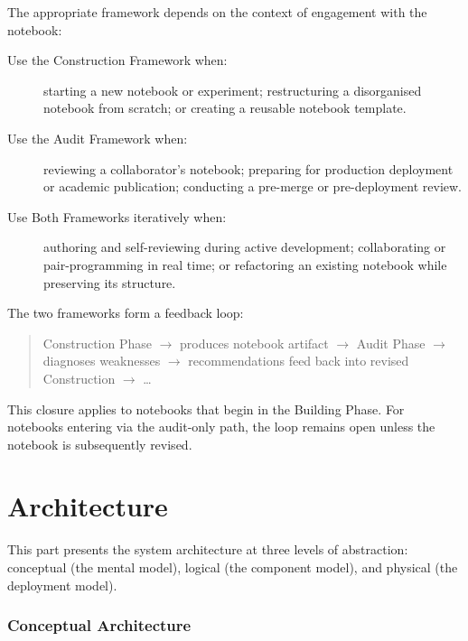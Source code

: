 \documentclass[11pt, a4paper]{article}
\begin{document}
The appropriate framework depends on the context of engagement with the
notebook:

\begin{description}
  \item[Use the Construction Framework when:] starting a new notebook or
    experiment; restructuring a disorganised notebook from scratch; or creating
    a reusable notebook template.

  \item[Use the Audit Framework when:] reviewing a collaborator's notebook;
    preparing for production deployment or academic publication; conducting a
    pre-merge or pre-deployment review.

  \item[Use Both Frameworks iteratively when:] authoring and self-reviewing
    during active development; collaborating or pair-programming in real time;
    or refactoring an existing notebook while preserving its structure.
\end{description}

The two frameworks form a feedback loop:

\begin{quote}
  Construction Phase $\rightarrow$ produces notebook artifact $\rightarrow$
  Audit Phase $\rightarrow$ diagnoses weaknesses $\rightarrow$
  recommendations feed back into revised Construction $\rightarrow$ \ldots
\end{quote}

This closure applies to notebooks that begin in the Building Phase. For
notebooks entering via the audit-only path, the loop remains open unless the
notebook is subsequently revised.

\part{Architecture}

This part presents the system architecture at three levels of abstraction:
conceptual (the mental model), logical (the component model), and physical
(the deployment model).

\section{Conceptual Architecture}
\label{sec:conceptual-arch}
\end{document}

